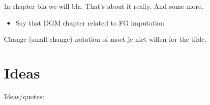 \documentclass[
  letterpaper,
  DIV=11,
  numbers=noendperiod]{scrreprt}
\providecommand{\tightlist}{%
  \setlength{\itemsep}{0pt}\setlength{\parskip}{0pt}}\usepackage{longtable,booktabs,array}
\begin{document}
In chapter bla we will bla. That's about it really. And some more.

\begin{itemize}
\tightlist
\item
  Say that DGM chapter related to FG imputation
\end{itemize}

Change (small change) notation of moet je niet willen for the tilde.

\hypertarget{ideas}{%
\section*{Ideas}\label{ideas}}


Ideas/quotes:
\end{document}
